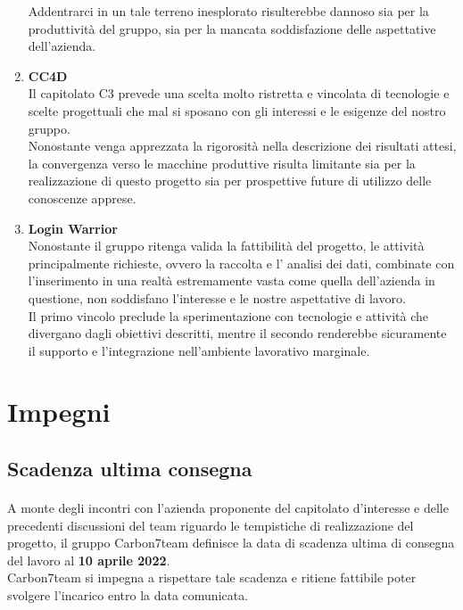 \begin{enumerate}
      Addentrarci in un tale terreno inesplorato risulterebbe dannoso sia per la produttività del gruppo, sia per
      la mancata soddisfazione delle aspettative dell'azienda.
    \newpage
    \item \textbf{CC4D} \\
      Il capitolato C3 prevede una scelta molto ristretta e vincolata di tecnologie e scelte progettuali che mal
      si sposano con gli interessi e le esigenze del nostro gruppo.\\
      Nonostante venga apprezzata la rigorosità nella descrizione dei risultati attesi, la convergenza verso le
      macchine produttive risulta limitante sia per la realizzazione di questo progetto sia per prospettive
      future di utilizzo delle conoscenze apprese.
    \item \textbf{Login Warrior} \\
      Nonostante il gruppo ritenga valida la fattibilità del progetto, le attività principalmente richieste,
      ovvero la raccolta e l' analisi dei dati, combinate con l'inserimento in una realtà estremamente vasta come
      quella dell'azienda in questione,  non soddisfano l'interesse e le nostre aspettative di lavoro.\\
      Il primo vincolo preclude la sperimentazione con tecnologie e attività che divergano dagli obiettivi
      descritti, mentre il secondo renderebbe sicuramente il supporto e l'integrazione nell'ambiente lavorativo
      marginale.
\end{enumerate}

\newpage

\section{Impegni}
\subsection{Scadenza ultima consegna}
\paragraph{}
A monte degli incontri con l’azienda proponente del capitolato d'interesse
e delle precedenti discussioni del team riguardo le tempistiche di realizzazione
del progetto, il gruppo Carbon7team definisce la data di scadenza ultima di
consegna del lavoro al \textbf{10 aprile 2022}.\\Carbon7team si impegna a rispettare tale
scadenza e ritiene fattibile poter svolgere l’incarico entro la data
comunicata.
